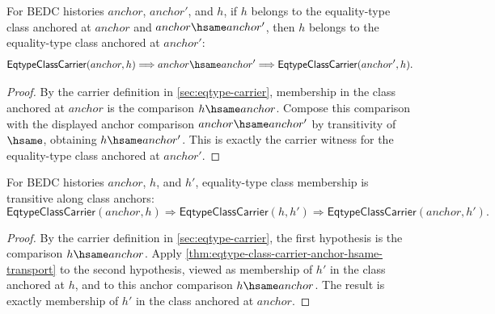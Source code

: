 \begin{theorem}
\label{thm:eqtype-class-carrier-anchor-hsame-transport}
For BEDC histories $anchor$, $anchor'$, and $h$, if $h$ belongs to the
 equality-type class anchored at $anchor$ and $anchor\hsame anchor'$, then $h$
 belongs to the equality-type class anchored at $anchor'$:
$$
\mathsf{EqtypeClassCarrier}(anchor,h)
\Longrightarrow
anchor\hsame anchor'
\Longrightarrow
\mathsf{EqtypeClassCarrier}(anchor',h).
$$
\end{theorem}
\begin{proof}
By the carrier definition in \autoref{sec:eqtype-carrier}, membership in the
class anchored at $anchor$ is the comparison $h\hsame anchor$. Compose this
comparison with the displayed anchor comparison $anchor\hsame anchor'$ by
transitivity of $\hsame$, obtaining $h\hsame anchor'$. This is exactly the
carrier witness for the equality-type class anchored at $anchor'$.
\end{proof}

\begin{theorem}
\label{thm:eqtype-class-carrier-transitive}
For BEDC histories $anchor$, $h$, and $h'$, equality-type class membership is
transitive along class anchors:
$$
\mathsf{EqtypeClassCarrier}(anchor,h)
\Longrightarrow
\mathsf{EqtypeClassCarrier}(h,h')
\Longrightarrow
\mathsf{EqtypeClassCarrier}(anchor,h').
$$
\end{theorem}
\begin{proof}
By the carrier definition in \autoref{sec:eqtype-carrier}, the first hypothesis
is the comparison $h\hsame anchor$. Apply
\autoref{thm:eqtype-class-carrier-anchor-hsame-transport} to the second
hypothesis, viewed as membership of $h'$ in the class anchored at $h$, and to
this anchor comparison $h\hsame anchor$. The result is exactly membership of
$h'$ in the class anchored at $anchor$.
\end{proof}
